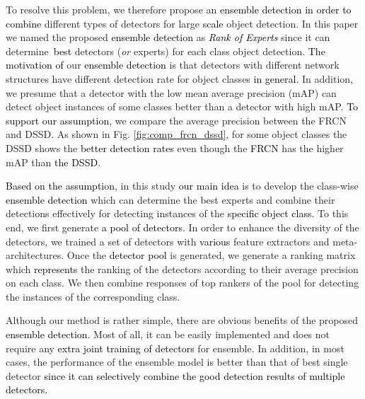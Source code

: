 \documentclass[10pt,twocolumn,letterpaper]{article}
\newcommand{\RE}{\textcolor{black}}
\newcommand{\RV}{\textcolor{black}}
\begin{document}
To resolve this problem, we therefore propose an \RE{ensemble detection} \RV{in order to combine} different types of detectors for large \RV{scale} object detection. In this paper we named the proposed \RE{ensemble detection} as \RV{\emph{Rank of Experts}} since it can determine\ \RE{best} detectors (\textit{or} experts) for each class object detection. \RE{The motivation of} our \RE{ensemble detection} is that detectors with different network structures  have different detection rate for object classes \RE{in general}. In addition, we presume that a detector with the low mean average precision (mAP) can detect object instances of some classes better than a detector with high mAP. \RE{To support our assumption}, we compare the average precision between the FRCN and DSSD. As shown in Fig. \ref{fig:comp_frcn_dssd}, for some object classes the DSSD shows the \RE{better detection rates} even though the \RE{FRCN}  has the higher mAP than \RE{the DSSD}. 


\RE{Based on the assumption}, in this study \RE{our main idea} is to develop the class-wise \RE{ensemble detection} which can determine the best experts and combine their detections effectively for detecting instances of the \RE{specific object class}. To this end, we first generate \RE{a pool of detectors}. In order to enhance the diversity of the detectors, we trained a set of detectors with \RV{various} feature extractors and meta-architectures. Once the \RV{detector pool} is generated, we generate a ranking matrix which \RE{represents} the ranking of the detectors according to their average precision on each class. We then combine responses of top rankers of the pool for detecting the instances of the corresponding class.


Although our method is rather simple, there are obvious benefits of the proposed \RE{ensemble detection}. Most of all, it can be easily implemented and does not require any \RE{extra joint training of detectors} for ensemble. In addition, in most cases, the performance of the ensemble model is better than that of best single detector \RV{since it can selectively combine the good detection results of multiple detectors.}
\end{document}
